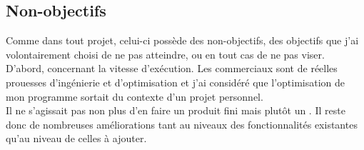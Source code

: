 \subsection{Non-objectifs}
Comme dans tout projet, celui-ci possède des non-objectifs, \ie des objectifs
que j'ai volontairement choisi de ne pas atteindre, ou en tout cas de ne pas
viser.\\

D'abord, concernant la vitesse d'exécution. Les  commerciaux
sont de réelles prouesses d'ingénierie et d'optimisation et j'ai considéré que
l'optimisation de mon programme sortait du contexte d'un projet personnel.\\

Il ne s'agissait pas non plus d'en faire un produit fini mais plutôt un
. Il reste donc de nombreuses améliorations tant au
niveaux des fonctionnalités existantes qu'au niveau de celles à ajouter.
